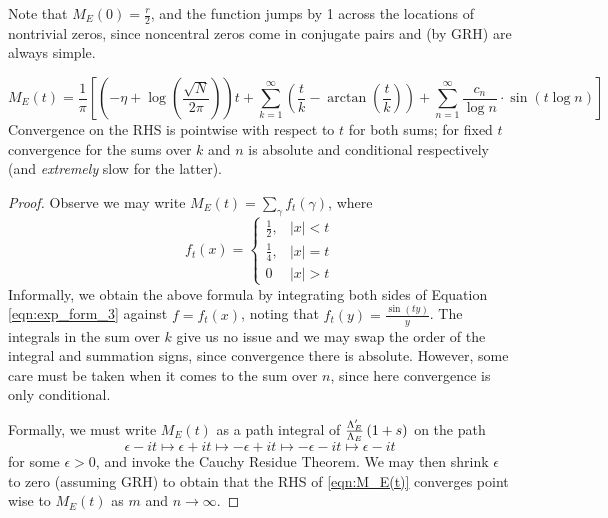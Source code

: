 Note that $M_E(0) = \frac{r}{2}$, and the function jumps by 1 across the locations of nontrivial zeros, since noncentral zeros come in conjugate pairs and (by GRH) are always simple. \\

\begin{proposition}[S.]
\begin{equation}\label{eqn:M_E(t)}
M_E(t) = \frac{1}{\pi}\left[\left(-\eta+\log\left(\frac{\sqrt{N}}{2\pi}\right)\right) t + \sum_{k=1}^{\infty} \left(\frac{t}{k} - \arctan\left(\frac{t}{k}\right)\right) + \sum_{n=1}^{\infty} \frac{c_n}{\log n}\cdot \sin(t\log n)\right]
\end{equation}
Convergence on the RHS is pointwise with respect to $t$ for both sums; for fixed $t$ convergence for the sums over $k$ and $n$ is absolute and conditional respectively (and {\it extremely} slow for the latter).
\end{proposition}

\begin{proof}
Observe we may write $M_E(t) = \sum_{\gamma}f_t(\gamma)$, where
\begin{equation}
f_t(x) = \begin{cases} \frac{1}{2}, & |x|<t \\ \frac{1}{4}, & |x| = t \\ 0 & |x|> t \end{cases}
\end{equation}
Informally, we obtain the above formula by integrating both sides of Equation \ref{eqn:exp_form_3} against $f = f_t(x)$, noting that $\hat{f}_t(y) = \frac{\sin(ty)}{y}$. The integrals in the sum over $k$ give us no issue and we may swap the order of the integral and summation signs, since convergence there is absolute. However, some care must be taken when it comes to the sum over $n$, since here convergence is only conditional. 

Formally, we must write $M_E(t)$ as a path integral of $\frac{\Lambda_E^{\prime}}{\Lambda_E}\left(1+s\right)$ on the path
\begin{equation*}
\epsilon-it \mapsto \epsilon+it \mapsto -\epsilon+it \mapsto -\epsilon-it \mapsto \epsilon-it
\end{equation*}
for some $\epsilon>0$, and invoke the Cauchy Residue Theorem. We may then shrink $\epsilon$ to zero (assuming GRH) to obtain that the RHS of \ref{eqn:M_E(t)} converges point wise to $M_E(t)$ as $m$ and $n \to \infty$.
\end{proof}


